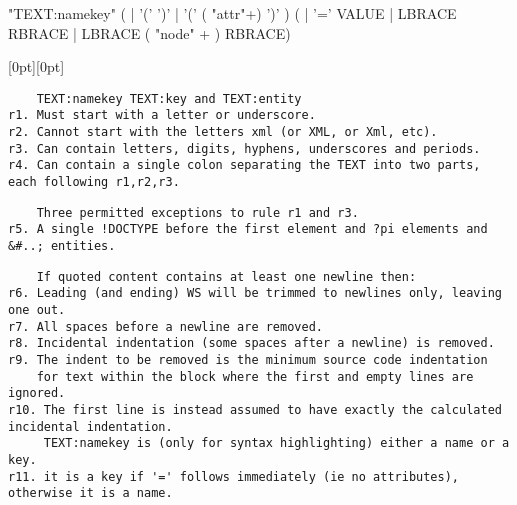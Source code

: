 \documentclass[10pt,a4paper]{article}
\makeatletter
\newcommand*{\shifttext}[2]{%
  \settowidth{\@tempdima}{#2}%
  \raisebox{0pt}[0pt][0pt]{%
  \makebox[\@tempdima]{\hspace*{#1}#2}}%
}
\makeatother
\begin{document}
\begin{minipage}{15cm}
  \begin{rail}
    "TEXT:namekey" ( | '(' ')' | '(' ( "attr"+) ')' ) ( | '=' VALUE | LBRACE RBRACE | LBRACE ( "node" + ) RBRACE)
  \end{rail}
\end{minipage}

\pagebreak

\shifttext{-20mm}{\raisebox{-8.8cm}{\smash{\rotatebox{90}{\rule{36mm}{0.5pt}\ \texttt{RULES}\ \rule{36mm}{.5pt}}}}}

\verb|    TEXT:namekey TEXT:key and TEXT:entity| \\
\verb|r1. Must start with a letter or underscore.| \\
\verb|r2. Cannot start with the letters xml (or XML, or Xml, etc).| \\
\verb|r3. Can contain letters, digits, hyphens, underscores and periods.| \\
\verb|r4. Can contain a single colon separating the TEXT into two parts, each following r1,r2,r3.|

\vspace{-1mm}
\verb|    Three permitted exceptions to rule r1 and r3.| \\
\verb|r5. A single !DOCTYPE before the first element and ?pi elements and &#..; entities.|

\vspace{-1mm}
\verb|    If quoted content contains at least one newline then:|\\
\verb|r6. Leading (and ending) WS will be trimmed to newlines only, leaving one out.| \\
\verb|r7. All spaces before a newline are removed.| \\
\verb|r8. Incidental indentation (some spaces after a newline) is removed.|\\
\verb|r9. The indent to be removed is the minimum source code indentation|\\
\verb|    for text within the block where the first and empty lines are ignored.|\\
\verb|r10. The first line is instead assumed to have exactly the calculated incidental indentation.|\\


\vspace{-1mm}
\verb|     TEXT:namekey is (only for syntax highlighting) either a name or a key.| \\
\verb|r11. it is a key if '=' follows immediately (ie no attributes), otherwise it is a name.|
\end{document}
